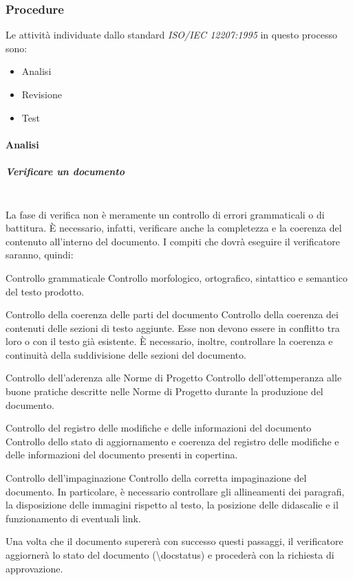 \subsubsection{Procedure}
Le attività individuate dallo standard \textit{ISO/IEC 12207:1995} in questo processo sono:
\begin{itemize}
    \item Analisi
    \item Revisione
    \item Test
\end{itemize}

\paragraph{Analisi}
\subparagraph{Verificare un documento}
\mbox{}\\
La fase di verifica non è meramente un controllo di errori grammaticali o di battitura. È necessario, infatti, verificare anche la completezza e la coerenza del contenuto all'interno del documento.
I compiti che dovrà eseguire il verificatore saranno, quindi:
\begin{enumdescript}
    \item [Controllo grammaticale] Controllo morfologico, ortografico, sintattico e semantico del testo prodotto.
    \item [Controllo della coerenza delle parti del documento] Controllo della coerenza dei contenuti delle sezioni di testo aggiunte. Esse non devono essere in conflitto tra loro o con il testo già esistente. È necessario, inoltre, controllare la coerenza e continuità della suddivisione delle sezioni del documento.
    \item [Controllo dell'aderenza alle Norme di Progetto] Controllo dell'ottemperanza alle buone pratiche descritte nelle Norme di Progetto durante la produzione del documento.
    \item [Controllo del registro delle modifiche e delle informazioni del documento] Controllo dello stato di aggiornamento e coerenza del registro delle modifiche e delle informazioni del documento presenti in copertina.
    \item [Controllo dell'impaginazione] Controllo della corretta impaginazione del documento. In particolare, è necessario controllare gli allineamenti dei paragrafi, la disposizione delle immagini rispetto al testo, la posizione delle didascalie e il funzionamento di eventuali link.
\end{enumdescript}
Una volta che il documento supererà con successo questi passaggi, il verificatore aggiornerà lo stato del documento (\textbackslash docstatus) e procederà con la richiesta di approvazione.

